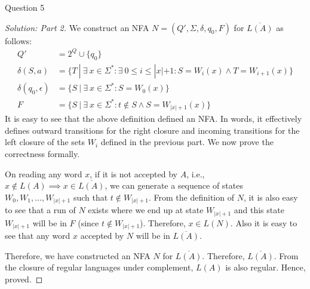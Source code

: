 \begin{solution}{Question 5}
    \begin{proof}[Solution: Part 2]
        We construct an NFA $N = (Q', \Sigma, \delta, q_0, F)$ for $\overline{L(A)}$ as follows:
        \begin{equation}
            \begin{split}
                Q' &= 2^Q \cup \{q_0\}\\
                \delta(S, a) &= \{T\ |\ \exists\ x \in \Sigma^* : \exists\ 0\leq i \leq |x|+1: S = W_i(x) \wedge T = W_{i+1}(x)\}\\
                \delta(q_0, \epsilon) &= \{S\ |\ \exists\ x \in \Sigma^* : S = W_0(x)\}\\
                F &= \{S\ |\ \exists\ x \in \Sigma^* : t \not\in S \wedge S = W_{|x|+1}(x)\}
            \end{split}
        \end{equation}
        It is easy to see that the above definition defined an NFA. In words, it effectively defines outward transitions for the right closure and incoming transitions for the left closure of the sets $W_i$ defined in the previous part. We now prove the correctness formally.\par
        On reading any word $x$, if it is not accepted by $A$, i.e., $x \not\in L(A) \implies x \in \overline{L(A)}$, we can generate a sequence of states $W_0, W_1, \ldots, W_{|x|+1}$ such that $t \not\in W_{|x|+1}$. From the definition of $N$, it is also easy to see that a run of $N$ exists where we end up at state $W_{|x|+1}$ and this state $W_{|x|+1}$ will be in $F$ (since $t \not\in W_{|x|+1}$). Therefore, $x \in L(N)$. Also it is easy to see that any word $x$ accepted by $N$ will be in $\overline{L(A)}$.\par
        Therefore, we have constructed an NFA $N$ for $\overline{L(A)}$. Therefore, $\overline{L(A)}$. From the closure of regular languages under complement, $L(A)$ is also regular. Hence, proved.
    \end{proof}
\end{solution}
